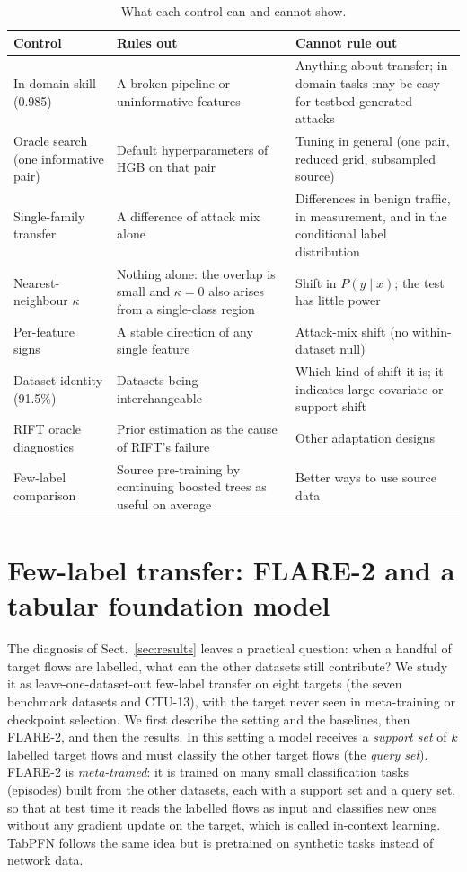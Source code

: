 \documentclass[pdflatex,sn-mathphys-num]{sn-jnl}%
\begin{document}
\begin{table}[htbp]
\centering\small
\caption{What each control can and cannot show.}\label{tab:controls}
\begin{tabular}{p{}p{}p{}}
\toprule
Control & Rules out & Cannot rule out \\
\midrule
In-domain skill (0.985) & A broken pipeline or uninformative features & Anything about transfer; in-domain tasks may be easy for testbed-generated attacks \\
Oracle search (one informative pair) & Default hyperparameters of HGB on that pair & Tuning in general (one pair, reduced grid, subsampled source) \\
Single-family transfer & A difference of attack mix alone & Differences in benign traffic, in measurement, and in the conditional label distribution \\
Nearest-neighbour $\kappa$ & Nothing alone: the overlap is small and $\kappa=0$ also arises from a single-class region & Shift in $P(y\mid x)$; the test has little power \\
Per-feature signs & A stable direction of any single feature & Attack-mix shift (no within-dataset null) \\
Dataset identity (91.5\%) & Datasets being interchangeable & Which kind of shift it is; it indicates large covariate or support shift \\
RIFT oracle diagnostics & Prior estimation as the cause of RIFT's failure & Other adaptation designs \\
Few-label comparison & Source pre-training by continuing boosted trees as useful on average & Better ways to use source data \\
\bottomrule
\end{tabular}
\end{table}

\section{Few-label transfer: FLARE-2 and a tabular foundation model}\label{sec:fewlabel}
The diagnosis of Sect.~\ref{sec:results} leaves a practical question: when a handful of target flows are labelled, what can the other datasets still contribute?
We study it as leave-one-dataset-out few-label transfer on eight targets (the seven benchmark datasets and CTU-13), with the target never seen in meta-training or checkpoint selection.
We first describe the setting and the baselines, then FLARE-2, and then the results.
In this setting a model receives a \emph{support set} of $k$ labelled target flows and must classify the other target flows (the \emph{query set}).
FLARE-2 is \emph{meta-trained}: it is trained on many small classification tasks (episodes) built from the other datasets, each with a support set and a query set, so that at test time it reads the labelled flows as input and classifies new ones without any gradient update on the target, which is called in-context learning.
TabPFN follows the same idea but is pretrained on synthetic tasks instead of network data.
\end{document}
